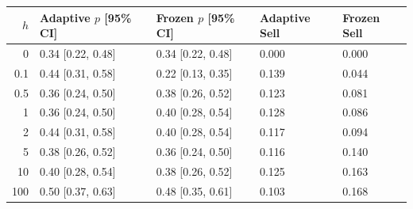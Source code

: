 \begin{center}
\begin{minipage}{\linewidth}\centering
\captionsetup{type=table,hypcap=false}
\caption{Adaptive versus frozen band widths for active technical traders at fraction $f=0.175$ over 50 starting markets. Frozen widths kept $\sigma_t$ at its value immediately before the rule switch, while the reference price $\mu_t$ continued to update. Entries $p$ are Sell-majority probabilities with 95\% Wilson confidence intervals (CI) in brackets. Sell is the mean fraction of technical traders in Sell over post-switch steps and starting markets. The probability at dealer depth $h=0.1$ minus that at $h=100$ was -0.06 with adaptive widths and -0.26 with frozen widths. Their paired difference was 0.20, with a 95\% interval [-0.08, 0.50] from 2,000 whole-market bootstrap samples.}
\label{tab:revision-band}
\small
\begin{tabular}{rllll}
\toprule
$h$ & Adaptive $p$ [95\% CI] & Frozen $p$ [95\% CI] & Adaptive Sell & Frozen Sell \\
\midrule
0 & 0.34 [0.22, 0.48] & 0.34 [0.22, 0.48] & 0.000 & 0.000 \\
0.1 & 0.44 [0.31, 0.58] & 0.22 [0.13, 0.35] & 0.139 & 0.044 \\
0.5 & 0.36 [0.24, 0.50] & 0.38 [0.26, 0.52] & 0.123 & 0.081 \\
1 & 0.36 [0.24, 0.50] & 0.40 [0.28, 0.54] & 0.128 & 0.086 \\
2 & 0.44 [0.31, 0.58] & 0.40 [0.28, 0.54] & 0.117 & 0.094 \\
5 & 0.38 [0.26, 0.52] & 0.36 [0.24, 0.50] & 0.116 & 0.140 \\
10 & 0.40 [0.28, 0.54] & 0.38 [0.26, 0.52] & 0.125 & 0.163 \\
100 & 0.50 [0.37, 0.63] & 0.48 [0.35, 0.61] & 0.103 & 0.168 \\
\bottomrule
\end{tabular}
\end{minipage}
\end{center}


